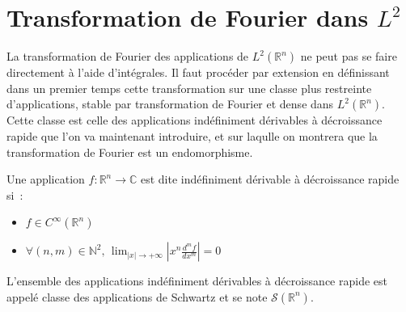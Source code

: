 \section{Transformation de Fourier dans $L^2$}
La transformation de Fourier des applications de  $L^2(\mathbb{R}^n)$ ne peut pas se faire directement
à l'aide d'intégrales. Il faut procéder par extension en définissant
dans un premier temps cette transformation sur une classe plus
restreinte d'applications, stable par transformation de Fourier et dense dans 
$L^2(\mathbb{R}^n)$. Cette classe est celle des applications indéfiniment
dérivables à décroissance rapide que l'on va maintenant introduire, et sur
laqulle on montrera que la transformation de Fourier est un endomorphisme.
\begin{mandatory} 
\begin{defn}
Une application $f : \mathbb{R}^n \to \mathbb{C}$ est dite
indéfiniment dérivable à décroissance rapide si~:
\begin{itemize}
\item $f \in C^\infty(\mathbb{R}^n)$
\item $\forall (n,m) \in
\mathbb{N}^2, \, \lim_{|x|\to +\infty} \left |
x^n \frac{d^m f}{dx^m} \right | = 0$
\end{itemize}
\end{defn}
\end{mandatory}
\begin{term}
L'ensemble des applications indéfiniment dérivables à décroissance
rapide est appelé classe des applications de Schwartz et se note $\mathcal{S}( \mathbb{R}^n)$.
\end{term}

